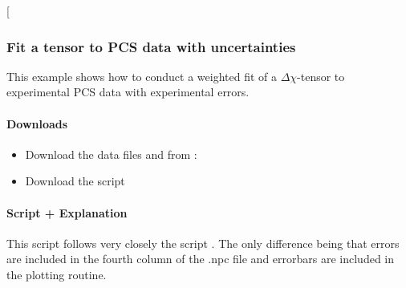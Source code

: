 \documentclass[a4paper,10pt,english,openany,oneside]{sphinxmanual}
\begin{document}
\begin{sphinxVerbatim}[commandchars=\\\{\}]
\end{sphinxVerbatim}

 {[}\sphinxcode{\sphinxupquote{pcs\_fit\_constrained.png}}{]}

\noindent{}


\subsubsection{Fit a tensor to PCS data with uncertainties}
\label{\detokenize{examples/pcs_fit_error:fit-a-tensor-to-pcs-data-with-uncertainties}}\label{\detokenize{examples/pcs_fit_error:pcs-fit-error}}\label{\detokenize{examples/pcs_fit_error::doc}}
This example shows how to conduct a weighted fit of a \({\Delta\chi}\)-tensor to experimental PCS data with experimental errors.


\paragraph{Downloads}
\label{\detokenize{examples/pcs_fit_error:downloads}}\begin{itemize}
\item {} 
Download the data files  and  from :

\item {} 
Download the script 

\end{itemize}


\paragraph{Script + Explanation}
\label{\detokenize{examples/pcs_fit_error:script-explanation}}
This script follows very closely the script {\hyperref[\detokenize{examples/pcs_fit:pcs-fit}]{}}. The only difference being that errors are included in the fourth column of the .npc file and errorbars are included in the plotting routine.
\end{document}
